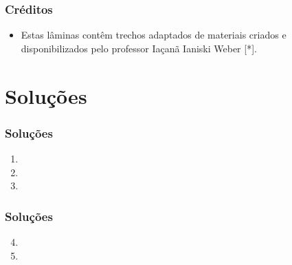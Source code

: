 \documentclass[aspectratio=169]{beamer}
\begin{document}
\begin{frame}\frametitle{Créditos}
\begin{itemize}
	\item Estas lâminas contêm trechos adaptados de materiais criados e disponibilizados pelo professor Iaçanã Ianiski Weber [*].
\end{itemize}
\end{frame}

\section{Soluções}

\begin{frame}\frametitle{Soluções}
\begin{enumerate}
	\item 

	\item 

	\item 
\end{enumerate}
\end{frame}

\begin{frame}\frametitle{Soluções}
\begin{enumerate}
        \setcounter{enumi}{3}
	\item 

	\item 

\end{enumerate}
\end{frame}

\end{document}
